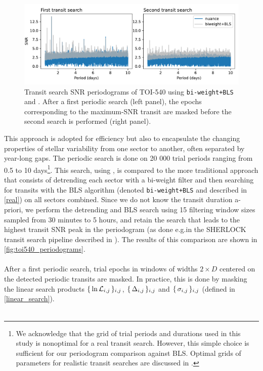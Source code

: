 \documentclass[modern]{aastex631}
\begin{document}
\begin{figure}[H]
    \begin{centering}
        \includegraphics[width=\linewidth]{./TOI_540/periodograms.pdf} 
        \caption{Transit search SNR periodograms of TOI-540 using \texttt{bi-weight+BLS} and \nuance{}. After a first periodic search (left panel), the epochs corresponding to the maximum-SNR transit are masked before the second search is performed (right panel). }
        \label{fig:toi540_periodograms}
    \end{centering}
\end{figure}
This approach is adopted for efficiency but also to encapsulate the changing properties of stellar variability from one sector to another, often separated by year-long gaps. The periodic search is done on 20 000 trial periods ranging from 0.5 to 10 days\footnote{We acknowledge that the grid of trial periods and durations used in this study is nonoptimal for a real transit search. However, this simple choice is sufficient for our periodogram comparison against BLS. Optimal grids of parameters for realistic transit searches are discussed in \cite{tls}.}. This search, using \nuancecode{}, is compared to the more traditional approach that consists of detrending each sector with a bi-weight filter and then searching for transits with the BLS algorithm (denoted \texttt{bi-weight+BLS} and described in \autoref{real}) on all sectors combined. Since we do not know the transit duration a-priori, we perform the detrending and BLS search using 15 filtering window sizes sampled from 30 minutes to 5 hours, and retain the search that leads to the highest transit SNR peak in the periodogram (as done e.g.\;in the SHERLOCK transit search pipeline described in \citealt{Pozuelos2020}). The results of this comparison are shown in \autoref{fig:toi540_periodograms}.\\\\
After a first periodic search, trial epochs in windows of widths $2\times D$ centered on the detected periodic transits are masked. In practice, this is done by masking the linear search products $\{\,\ln\mathcal{L}_{i,j}\,\}_{i, j}$, $\{\,\Delta_{i,j}\,\}_{i, j}$ and $\{\,\sigma_{i,j}\,\}_{i, j}$ (defined in \autoref{linear_search}).\\\\
\end{document}
